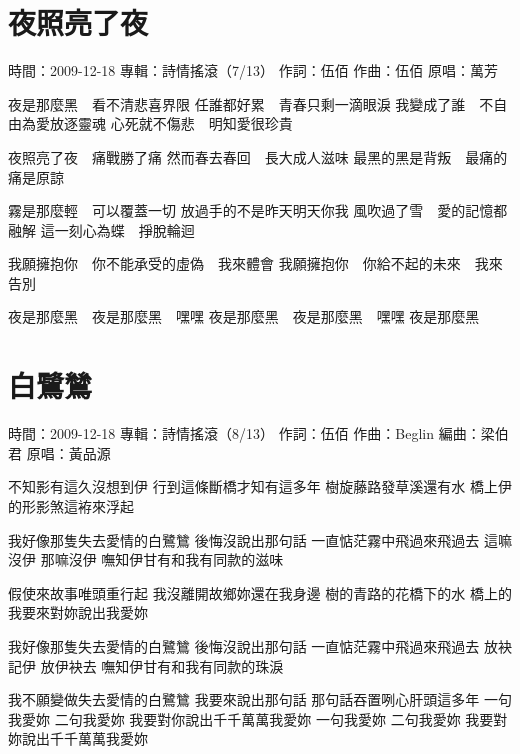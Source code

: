 \documentclass[UTF8,a4paper,oneside,twocolumn,12pt]{ctexbook}
\newcommand{\infopair}[2]{\textbullet #1：#2}
\newcommand{\zc}[1][伍佰]{\infopair{作詞}{#1}}
\newcommand{\zq}[1][伍佰]{\infopair{作曲}{#1}}
\newcommand{\bq}[1][伍佰]{\infopair{編曲}{#1}}
\newcommand{\zj}[1]{\infopair{專輯}{#1}}
\newcommand{\yc}[1]{\infopair{原唱}{#1}}
\newcommand{\sj}[1]{\infopair{時間}{#1}}
\newenvironment{info}{\begin{flushleft}\kaishu
	}
	{\end{flushleft}\normalsize\yahei\par}
\newenvironment{lyric}{
	}
{}
\begin{document}
\section{夜照亮了夜}
\begin{info}
	\sj{2009-12-18}
	\zj{詩情搖滾（7/13）}
	\zc
	\zq
	\yc{萬芳}
\end{info}
\begin{lyric}
	夜是那麼黑　看不清悲喜界限
	任誰都好累　青春只剩一滴眼淚
	我變成了誰　不自由為愛放逐靈魂
	心死就不傷悲　明知愛很珍貴

	夜照亮了夜　痛戰勝了痛
	然而春去春回　長大成人滋味
	最黑的黑是背叛　最痛的痛是原諒

	霧是那麼輕　可以覆蓋一切
	放過手的不是昨天明天你我
	風吹過了雪　愛的記憶都融解
	這一刻心為蝶　掙脫輪迴

	我願擁抱你　你不能承受的虛偽　我來體會
	我願擁抱你　你給不起的未來　我來告別

	夜是那麼黑　夜是那麼黑　嘿嘿
	夜是那麼黑　夜是那麼黑　嘿嘿
	夜是那麼黑
\end{lyric}

\section{白鷺鷥}
\begin{info}
	\sj{2009-12-18}
	\zj{詩情搖滾（8/13）}
	\zc
	\zq[Beglin]
	\bq[梁伯君]
	\yc{黃品源}
\end{info}
\begin{lyric}
	不知影有這久沒想到伊 行到這條斷橋才知有這多年
	樹旋藤路發草溪還有水 橋上伊的形影煞這袸來浮起

	我好像那隻失去愛情的白鷺鷥 後悔沒說出那句話
	一直惦茫霧中飛過來飛過去 這嘛沒伊 那嘛沒伊
	嘸知伊甘有和我有同款的滋味

	假使來故事唯頭重行起 我沒離開故鄉妳還在我身邊
	樹的青路的花橋下的水 橋上的我要來對妳說出我愛妳

	我好像那隻失去愛情的白鷺鷥 後悔沒說出那句話
	一直惦茫霧中飛過來飛過去 放袂記伊 放伊袂去
	嘸知伊甘有和我有同款的珠淚

	我不願變做失去愛情的白鷺鷥 我要來說出那句話
	那句話吞置咧心肝頭這多年
	一句我愛妳 二句我愛妳 我要對你說出千千萬萬我愛妳
	一句我愛妳 二句我愛妳 我要對妳說出千千萬萬我愛妳
\end{lyric}
\end{document}
